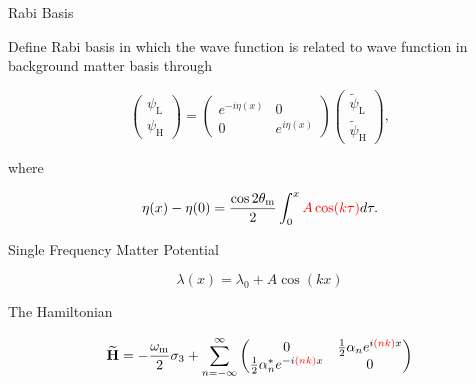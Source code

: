 \documentclass[9pt]{beamer}
\begin{document}
\begin{darkframes}
\begin{frame}{Rabi Basis}
\begin{tcolorbox}[title=A Better Basis]


Define Rabi basis %
in which the wave function is related to wave function in background matter basis
through

\begin{equation*}
    \begin{pmatrix}
    \psi_{\mathrm{L} } \\
    \psi_{\mathrm{H} }
    \end{pmatrix} = \begin{pmatrix}
     e^{-i \eta (x)} & 0 \\  0 & e^{i \eta (x)}
    \end{pmatrix}\begin{pmatrix}
    \tilde\psi_{\mathrm{L} }\\
    \tilde\psi_{\mathrm{H} }
    \end{pmatrix},
\end{equation*}

where

\begin{equation*}
    \eta(x) - \eta(0) = \frac{\cos 2\theta_{\mathrm{m}}}{2} \int_0^x {\color{red}A\cos(k \tau)} d\tau.
\end{equation*}

\end{tcolorbox}



\end{frame}














\begin{frame}{Single Frequency Matter Potential}



\begin{equation*}
\lambda(x) = \lambda_0 +  A \cos(k x )
\end{equation*}


\begin{tcolorbox}[title=Hamiltonian in Rabi Basis]

The Hamiltonian


\begin{equation*}
\mathbf{\widetilde H}= -\frac{\omega_{\mathrm m}}{2}\sigma_3 + \sum_{n=-\infty}^{\infty} \begin{pmatrix}
0 & \frac{1}{2}  \alpha_n e^{i  {\color{red} (n k) } x}\\
\frac{1}{2}  \alpha_n^* e^{ -i  {\color{red} (n k) } x} & 0
\end{pmatrix}
\end{equation*}



\end{tcolorbox}
\end{frame}
\end{darkframes}
\end{document}
